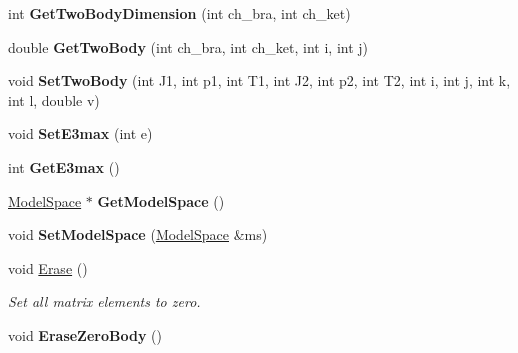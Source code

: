 \begin{DoxyCompactItemize}
\item 
int {\bfseries Get\+Two\+Body\+Dimension} (int ch\+\_\+bra, int ch\+\_\+ket)\hypertarget{classOperator_aa2b42d5c6afffc790b9a7466787d7237}{}\label{classOperator_aa2b42d5c6afffc790b9a7466787d7237}

\item 
double {\bfseries Get\+Two\+Body} (int ch\+\_\+bra, int ch\+\_\+ket, int i, int j)\hypertarget{classOperator_a5ef7a48c8c873a79ff695a6b71d83803}{}\label{classOperator_a5ef7a48c8c873a79ff695a6b71d83803}

\item 
void {\bfseries Set\+Two\+Body} (int J1, int p1, int T1, int J2, int p2, int T2, int i, int j, int k, int l, double v)\hypertarget{classOperator_a04d1aa8242f17370f5827aad6b3f6ddb}{}\label{classOperator_a04d1aa8242f17370f5827aad6b3f6ddb}

\item 
void {\bfseries Set\+E3max} (int e)\hypertarget{classOperator_a8b32ed75e5e0d6175a2f2f517c63a89c}{}\label{classOperator_a8b32ed75e5e0d6175a2f2f517c63a89c}

\item 
int {\bfseries Get\+E3max} ()\hypertarget{classOperator_a42d67df774701e40e2c49e539a68c937}{}\label{classOperator_a42d67df774701e40e2c49e539a68c937}

\item 
\hyperlink{classModelSpace}{Model\+Space} $\ast$ {\bfseries Get\+Model\+Space} ()\hypertarget{classOperator_aeacbeb2efba4199ad20291b50f03f4f6}{}\label{classOperator_aeacbeb2efba4199ad20291b50f03f4f6}

\item 
void {\bfseries Set\+Model\+Space} (\hyperlink{classModelSpace}{Model\+Space} \&ms)\hypertarget{classOperator_ade09f5e47031f285f10d7f4f8a5e0216}{}\label{classOperator_ade09f5e47031f285f10d7f4f8a5e0216}

\item 
void \hyperlink{classOperator_a8a0f7d6aa5163929850d06b31dc24a55}{Erase} ()\hypertarget{classOperator_a8a0f7d6aa5163929850d06b31dc24a55}{}\label{classOperator_a8a0f7d6aa5163929850d06b31dc24a55}

\begin{DoxyCompactList}\small\item\em Set all matrix elements to zero. \end{DoxyCompactList}\item 
void {\bfseries Erase\+Zero\+Body} ()\hypertarget{classOperator_aee08b8c721271c700f325e02ba7b47d1}{}\label{classOperator_aee08b8c721271c700f325e02ba7b47d1}


\end{DoxyCompactItemize}
